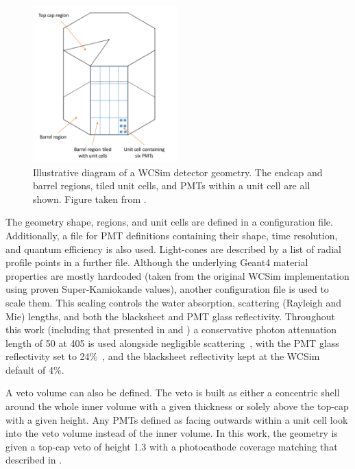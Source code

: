 \begin{figure} %
    \includegraphics[width=0.5\textwidth]{diagrams/4-chips/sim_geom.pdf}
    \caption[Illustrative diagram of a WCSim detector geometry]
    {Illustrative diagram of a WCSim detector geometry. The endcap and barrel regions, tiled unit
        cells, and PMTs within a unit cell are all shown. Figure taken from
        .}
    \label{fig:sim_geom}
\end{figure}

The geometry shape, regions, and unit cells are defined in a configuration file. Additionally, a
file for PMT definitions containing their shape, time resolution, and quantum efficiency is also
used. Light-cones are described by a list of radial profile points in a further file. Although the
underlying Geant4 material properties are mostly hardcoded (taken from the original WCSim
implementation using proven Super-Kamiokande values), another configuration file is used to scale
them. This scaling controls the water absorption, scattering (Rayleigh and Mie) lengths, and both
the blacksheet and PMT glass reflectivity. Throughout this work (including that presented in
 and ) a conservative photon attenuation length of
\SI{50}{} at \SI{405}{} is used alongside negligible
scattering~\cite{campbell2020}, with the PMT glass reflectivity set to
24\%~\cite{hamamatsu_handbook}, and the blacksheet reflectivity kept at the WCSim default of 4\%.

A veto volume can also be defined. The veto is built as either a concentric shell around the whole
inner volume with a given thickness or solely above the top-cap with a given height. Any PMTs
defined as facing outwards within a unit cell look into the veto volume instead of the inner
volume. In this work, the \chipsfive geometry is given a top-cap veto of height \SI{1.3}{}
with a photocathode coverage matching that described in
.

